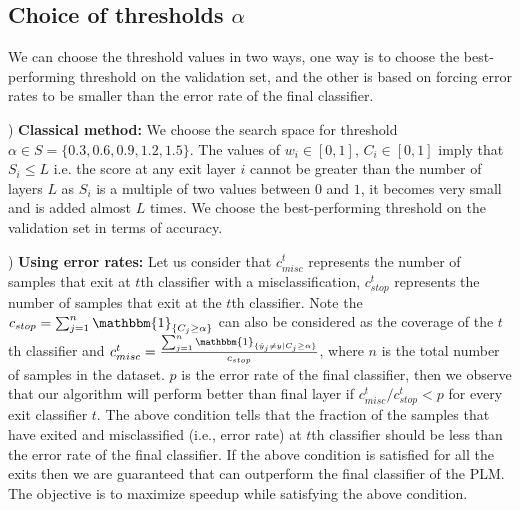 \subsection{Choice of thresholds $\alpha$}\label{sec: thresholds}
We can choose the threshold values in two ways, one way is to choose the best-performing threshold on the validation set, and the other is based on forcing error rates to be smaller than the error rate of the final classifier.

) \textbf{Classical method:} We choose the search space for threshold $\alpha\in S =  \{0.3, 0.6, 0.9, 1.2, 1.5\}$. The values of $w_i\in [0,1]$, $C_i\in [0,1]$ imply that $S_i \leq L$ i.e. the score at any exit layer $i$ cannot be greater than the number of layers $L$ as $S_i$ is a multiple of two values between $0$ and $1$, it becomes very small and is added almost $L$ times. We choose the best-performing threshold on the validation set in terms of accuracy.

) \textbf{Using error rates:}
Let us consider that $c_{misc}^t$ represents the number of samples that exit at $t$th classifier with a misclassification, $c_{stop}^t$ represents the number of samples that exit at the $t$th classifier. Note the $c_{stop} = \sum_{j=1}^{n}\mathbbm{1}_{\{C_j\geq\alpha\}}$ can also be considered as the coverage of the $t$th classifier and $c_{misc}^t = \frac{\sum_{j =1}^{n}\mathbbm{1}_{\{\hat{y}_j \neq y|C_j\geq\alpha\}}}{c_{stop}}$, where $n$ is the total number of samples in the dataset. $p$ is the error rate of the final classifier, then we observe that our algorithm will perform better than final layer if $c_{misc}^t/c_{stop}^t<p$ for every exit classifier $t$. The above condition tells that the fraction of the samples that have exited and misclassified (i.e., error rate) at $t$th classifier should be less than the error rate of the final classifier. If the above condition is satisfied for all the exits then we are guaranteed that \algo{} can outperform the final classifier of the PLM. The objective is to maximize speedup while satisfying the above condition.  

